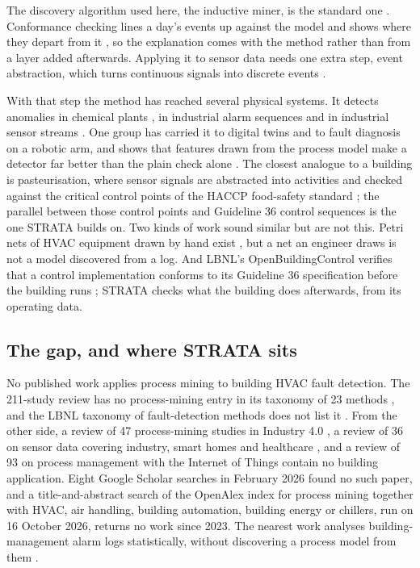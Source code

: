 \documentclass[conference]{IEEEtran}
\begin{document}
The discovery algorithm used here, the inductive miner, is the standard one \cite{leemans2013inductiveminer}. Conformance checking lines a day's events up against the model and shows where they depart from it \cite{carmona2018conformancechecking}, so the explanation comes with the method rather than from a layer added afterwards. Applying it to sensor data \cite{bezerra2013anomalytraces} needs one extra step, event abstraction, which turns continuous signals into discrete events \cite{janssen2021sensoreventlog,brzychczy2025pmsensorreview}.

With that step the method has reached several physical systems. It detects anomalies in chemical plants \cite{shi2024processanomaly}, in industrial alarm sequences \cite{norouzifar2026alarmsequences} and in industrial sensor streams \cite{husom2026udava}. One group has carried it to digital twins and to fault diagnosis on a robotic arm, and shows that features drawn from the process model make a detector far better than the plain check alone \cite{vitale2025digitaltwin,vitale2025roadcps,vitale2025kbsfeatures}. The closest analogue to a building is pasteurisation, where sensor signals are abstracted into activities and checked against the critical control points of the HACCP food-safety standard \cite{moradbeikie2025pasteurization}; the parallel between those control points and Guideline 36 control sequences is the one STRATA builds on. Two kinds of work sound similar but are not this. Petri nets of HVAC equipment drawn by hand exist \cite{deabes2023fuzzyptn}, but a net an engineer draws is not a model discovered from a log. And LBNL's OpenBuildingControl verifies that a control implementation conforms to its Guideline 36 specification before the building runs \cite{wetter2022obc}; STRATA checks what the building does afterwards, from its operating data.

\subsection{The gap, and where STRATA sits}

No published work applies process mining to building HVAC fault detection. The 211-study review has no process-mining entry in its taxonomy of 23 methods \cite{bi2024aihvacreview}, and the LBNL taxonomy of fault-detection methods does not list it \cite{granderson2017fddtoolsurvey}. From the other side, a review of 47 process-mining studies in Industry 4.0 \cite{akhramovich2024pmindustry40}, a review of 36 on sensor data covering industry, smart homes and healthcare \cite{brzychczy2025pmsensorreview}, and a review of 93 on process management with the Internet of Things \cite{deluzi2025bpmiotreview} contain no building application. Eight Google Scholar searches in February 2026 found no such paper, and a title-and-abstract search of the OpenAlex index for process mining together with HVAC, air handling, building automation, building energy or chillers, run on 16 October 2026, returns no work since 2023. The nearest work analyses building-management alarm logs statistically, without discovering a process model from them \cite{shahid2026alarmlogs}.
\end{document}
